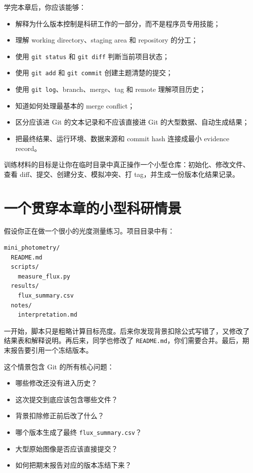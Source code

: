 学完本章后，你应该能够：

\begin{itemize}
    \item 解释为什么版本控制是科研工作的一部分，而不是程序员专用技能；
    \item 理解 working directory、staging area 和 repository 的分工；
    \item 使用 \texttt{git status} 和 \texttt{git diff} 判断当前项目状态；
    \item 使用 \texttt{git add} 和 \texttt{git commit} 创建主题清楚的提交；
    \item 使用 \texttt{git log}、branch、merge、tag 和 remote 理解项目历史；
    \item 知道如何处理最基本的 merge conflict；
    \item 区分应该进 Git 的文本记录和不应该直接进 Git 的大型数据、自动生成结果；
    \item 把最终结果、运行环境、数据来源和 commit hash 连接成最小 evidence record。
\end{itemize}

训练材料的目标是让你在临时目录中真正操作一个小型仓库：初始化、修改文件、查看 diff、提交、创建分支、模拟冲突、打 tag，并生成一份版本化结果记录。

\section{一个贯穿本章的小型科研情景}

假设你正在做一个很小的光度测量练习。项目目录中有：

\begin{lstlisting}[style=terminal]
mini_photometry/
  README.md
  scripts/
    measure_flux.py
  results/
    flux_summary.csv
  notes/
    interpretation.md
\end{lstlisting}

一开始，脚本只是粗略计算目标亮度。后来你发现背景扣除公式写错了，又修改了结果表和解释说明。再后来，同学也修改了 \texttt{README.md}，你们需要合并。最后，期末报告要引用一个冻结版本。

这个情景包含 Git 的所有核心问题：

\begin{itemize}
    \item 哪些修改还没有进入历史？
    \item 这次提交到底应该包含哪些文件？
    \item 背景扣除修正前后改了什么？
    \item 哪个版本生成了最终 \texttt{flux\_summary.csv}？
    \item 大型原始图像是否应该直接提交？
    \item 如何把期末报告对应的版本冻结下来？
\end{itemize}

